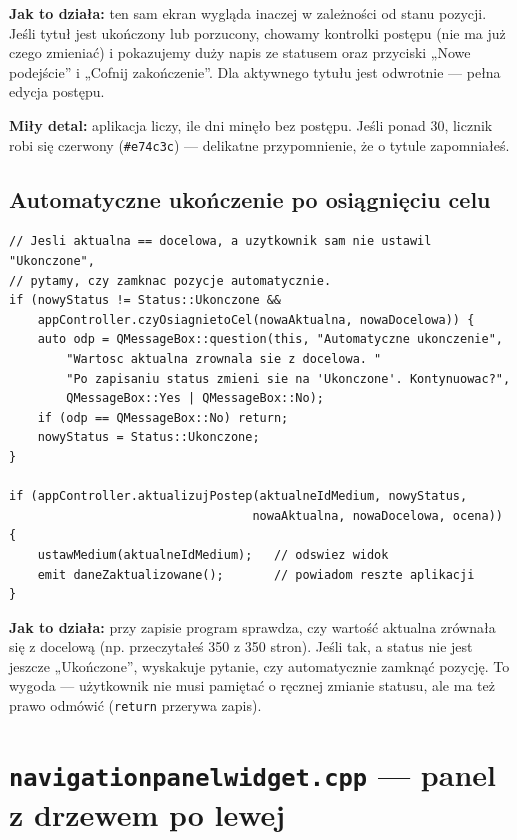\documentclass[11pt,a4paper]{article}
\begin{document}
\textbf{Jak to działa:} ten sam ekran wygląda inaczej w zależności od stanu
pozycji. Jeśli tytuł jest ukończony lub porzucony, chowamy kontrolki postępu
(nie ma już czego zmieniać) i pokazujemy duży napis ze statusem oraz przyciski
„Nowe podejście” i „Cofnij zakończenie”. Dla aktywnego tytułu jest odwrotnie ---
pełna edycja postępu.

\textbf{Miły detal:} aplikacja liczy, ile dni minęło bez postępu. Jeśli ponad 30,
licznik robi się czerwony (\texttt{\#e74c3c}) --- delikatne przypomnienie, że
o tytule zapomniałeś.

\subsection{Automatyczne ukończenie po osiągnięciu celu}

\begin{lstlisting}[caption={Pytanie o automatyczne zamknięcie pozycji}]
// Jesli aktualna == docelowa, a uzytkownik sam nie ustawil "Ukonczone",
// pytamy, czy zamknac pozycje automatycznie.
if (nowyStatus != Status::Ukonczone &&
    appController.czyOsiagnietoCel(nowaAktualna, nowaDocelowa)) {
    auto odp = QMessageBox::question(this, "Automatyczne ukonczenie",
        "Wartosc aktualna zrownala sie z docelowa. "
        "Po zapisaniu status zmieni sie na 'Ukonczone'. Kontynuowac?",
        QMessageBox::Yes | QMessageBox::No);
    if (odp == QMessageBox::No) return;
    nowyStatus = Status::Ukonczone;
}

if (appController.aktualizujPostep(aktualneIdMedium, nowyStatus,
                                  nowaAktualna, nowaDocelowa, ocena)) {
    ustawMedium(aktualneIdMedium);   // odswiez widok
    emit daneZaktualizowane();       // powiadom reszte aplikacji
}
\end{lstlisting}

\textbf{Jak to działa:} przy zapisie program sprawdza, czy wartość aktualna
zrównała się z docelową (np. przeczytałeś 350 z 350 stron). Jeśli tak, a status
nie jest jeszcze „Ukończone”, wyskakuje pytanie, czy automatycznie zamknąć pozycję.
To wygoda --- użytkownik nie musi pamiętać o ręcznej zmianie statusu, ale ma też
prawo odmówić (\texttt{return} przerywa zapis).

\section{\texttt{navigationpanelwidget.cpp} --- panel z drzewem po lewej}
\end{document}
